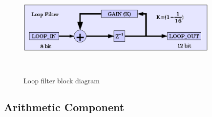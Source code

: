 \documentclass[a4paper,10pt]{article}
\begin{document}
\begin{itemize}
\begin{figure}[H]
\center
\includegraphics[width=10.0cm,height=5.0cm]{loop_filter.eps}
\caption {Loop filter block diagram}
\end{figure}

% 
% 

\end{itemize}

\subsection{Arithmetic Component}
\end{document}
